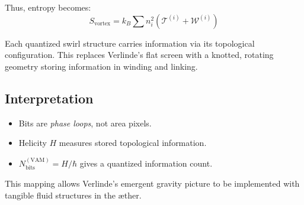 \documentclass[preprint]{revtex4-2}
\begin{document}
            Thus, entropy becomes:
            \begin{equation}
            \boxed{
            S_\text{vortex} = k_B \sum n_i^2 (\mathcal{T}^{(i)} + \mathcal{W}^{(i)})
            }
            \end{equation}

            Each quantized swirl structure carries information via its topological configuration. This replaces Verlinde's flat screen with a knotted, rotating geometry storing information in winding and linking.

            \subsection*{Interpretation}
            \begin{itemize}
            \item Bits are \textit{phase loops}, not area pixels.
                \item Helicity $H$ measures stored topological information.
                \item $N_\text{bits}^{(\text{VAM})} = H / \hbar$ gives a quantized information count.
            \end{itemize}

            This mapping allows Verlinde's emergent gravity picture to be implemented with tangible fluid structures in the æther.
\end{document}
